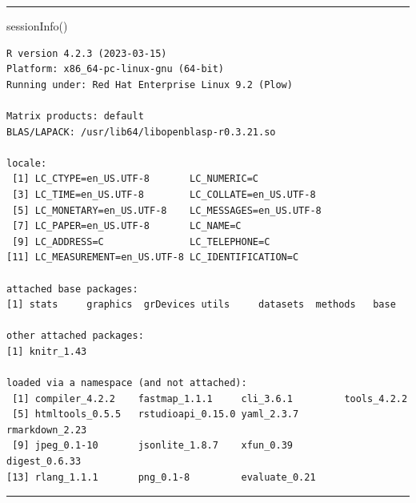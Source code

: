\documentclass[
  letterpaper,
  DIV=11,
  numbers=noendperiod]{scrartcl}
\newenvironment{Shaded}{\begin{snugshade}}{\end{snugshade}}
\newcommand{\FunctionTok}[1]{\textcolor[rgb]{0.28,0.35,0.67}{#1}}
\newcommand{\NormalTok}[1]{\textcolor[rgb]{0.00,0.23,0.31}{#1}}
\begin{document}
\begin{center}\rule{0.5\linewidth}{0.5pt}\end{center}

\begin{Shaded}
\begin{Highlighting}[]
\FunctionTok{sessionInfo}\NormalTok{()}
\end{Highlighting}
\end{Shaded}

\begin{verbatim}
R version 4.2.3 (2023-03-15)
Platform: x86_64-pc-linux-gnu (64-bit)
Running under: Red Hat Enterprise Linux 9.2 (Plow)

Matrix products: default
BLAS/LAPACK: /usr/lib64/libopenblasp-r0.3.21.so

locale:
 [1] LC_CTYPE=en_US.UTF-8       LC_NUMERIC=C              
 [3] LC_TIME=en_US.UTF-8        LC_COLLATE=en_US.UTF-8    
 [5] LC_MONETARY=en_US.UTF-8    LC_MESSAGES=en_US.UTF-8   
 [7] LC_PAPER=en_US.UTF-8       LC_NAME=C                 
 [9] LC_ADDRESS=C               LC_TELEPHONE=C            
[11] LC_MEASUREMENT=en_US.UTF-8 LC_IDENTIFICATION=C       

attached base packages:
[1] stats     graphics  grDevices utils     datasets  methods   base     

other attached packages:
[1] knitr_1.43

loaded via a namespace (and not attached):
 [1] compiler_4.2.2    fastmap_1.1.1     cli_3.6.1         tools_4.2.2      
 [5] htmltools_0.5.5   rstudioapi_0.15.0 yaml_2.3.7        rmarkdown_2.23   
 [9] jpeg_0.1-10       jsonlite_1.8.7    xfun_0.39         digest_0.6.33    
[13] rlang_1.1.1       png_0.1-8         evaluate_0.21    
\end{verbatim}

\begin{center}\rule{0.5\linewidth}{0.5pt}\end{center}
\end{document}
